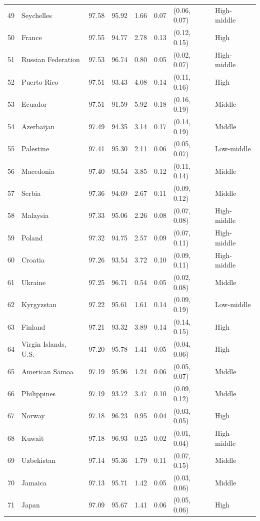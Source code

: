 \begin{longtable}{r l r r r r l l}
49 & Seychelles & 97.58 & 95.92 & 1.66 & 0.07 & (0.06, 0.07) & High-middle \\
50 & France & 97.55 & 94.77 & 2.78 & 0.13 & (0.12, 0.15) & High \\
51 & Russian Federation & 97.53 & 96.74 & 0.80 & 0.05 & (0.02, 0.07) & High-middle \\
52 & Puerto Rico & 97.51 & 93.43 & 4.08 & 0.14 & (0.11, 0.16) & High \\
53 & Ecuador & 97.51 & 91.59 & 5.92 & 0.18 & (0.16, 0.19) & Middle \\
54 & Azerbaijan & 97.49 & 94.35 & 3.14 & 0.17 & (0.14, 0.19) & Middle \\
55 & Palestine & 97.41 & 95.30 & 2.11 & 0.06 & (0.05, 0.07) & Low-middle \\
56 & Macedonia & 97.40 & 93.54 & 3.85 & 0.12 & (0.11, 0.14) & Middle \\
57 & Serbia & 97.36 & 94.69 & 2.67 & 0.11 & (0.09, 0.12) & Middle \\
58 & Malaysia & 97.33 & 95.06 & 2.26 & 0.08 & (0.07, 0.08) & High-middle \\
59 & Poland & 97.32 & 94.75 & 2.57 & 0.09 & (0.07, 0.11) & High-middle \\
60 & Croatia & 97.26 & 93.54 & 3.72 & 0.10 & (0.09, 0.11) & High-middle \\
61 & Ukraine & 97.25 & 96.71 & 0.54 & 0.05 & (0.02, 0.08) & Middle \\
62 & Kyrgyzstan & 97.22 & 95.61 & 1.61 & 0.14 & (0.09, 0.19) & Low-middle \\
63 & Finland & 97.21 & 93.32 & 3.89 & 0.14 & (0.14, 0.15) & High \\
64 & Virgin Islands, U.S. & 97.20 & 95.78 & 1.41 & 0.05 & (0.04, 0.06) & High \\
65 & American Samoa & 97.19 & 95.96 & 1.24 & 0.06 & (0.05, 0.07) & Middle \\
66 & Philippines & 97.19 & 93.72 & 3.47 & 0.10 & (0.09, 0.12) & Middle \\
67 & Norway & 97.18 & 96.23 & 0.95 & 0.04 & (0.03, 0.05) & High \\
68 & Kuwait & 97.18 & 96.93 & 0.25 & 0.02 & (0.01, 0.04) & High-middle \\
69 & Uzbekistan & 97.14 & 95.36 & 1.79 & 0.11 & (0.07, 0.15) & Middle \\
70 & Jamaica & 97.13 & 95.71 & 1.42 & 0.05 & (0.03, 0.06) & Middle \\
71 & Japan & 97.09 & 95.67 & 1.41 & 0.06 & (0.05, 0.06) & High \\

\end{longtable}
